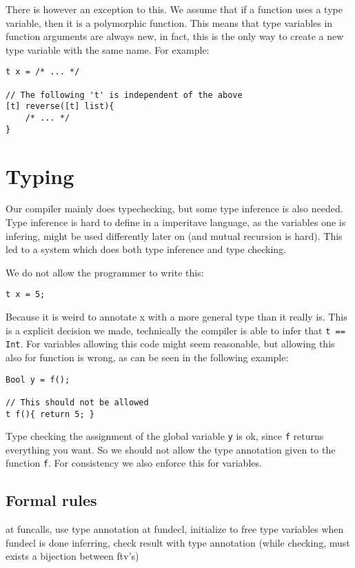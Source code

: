 \documentclass[14pt]{amsart}
\begin{document}
There is however an exception to this. We assume that if a function uses a type variable, then it is a polymorphic function. This means that type variables in function arguments are always new, in fact, this is the only way to create a new type variable with the same name. For example:

\begin{lstlisting}
t x = /* ... */

// The following 't' is independent of the above
[t] reverse([t] list){
	/* ... */
}
\end{lstlisting}

\section{Typing}

Our compiler mainly does typechecking, but some type inference is also needed. Type inference is hard to define in a imperitave language, as the variables one is infering, might be used differently later on (and mutual recursion is hard). This led to a system which does both type inference and type checking.

We do not allow the programmer to write this:

\begin{lstlisting}
t x = 5;
\end{lstlisting}

Because it is weird to annotate x with a more general type than it really is. This is a explicit decision we made, technically the compiler is able to infer that \texttt{t == Int}. For variables allowing this code might seem reasonable, but allowing this also for function is wrong, as can be seen in the following example:

\begin{lstlisting}
Bool y = f();

// This should not be allowed
t f(){ return 5; }
\end{lstlisting}

Type checking the assignment of the global variable \texttt{y} is ok, since \texttt{f} returns everything you want. So we should not allow the type annotation given to the function \texttt{f}. For consistency we also enforce this for variables.

\subsection{Formal rules}
at funcalls, use type annotation
at fundecl, initialize to free type variables
when fundecl is done inferring, check result with type annotation (while checking, must exists a bijection between ftv's)
\end{document}

